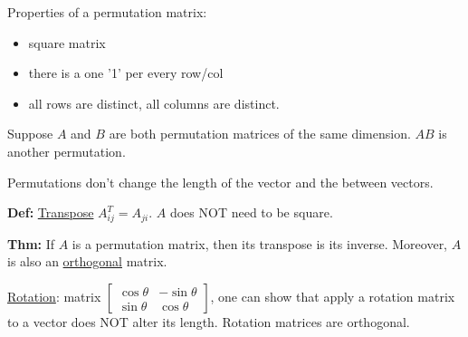 \documentclass{report}
\begin{document}
Properties of a permutation matrix:
\begin{itemize}
    \item square matrix
    \item there is a one '1' per every row/col
    \item all rows are distinct, all columns are distinct.
\end{itemize}

Suppose $A$ and $B$ are both permutation matrices of the same dimension.
$AB$ is another permutation.

Permutations don't change the length of the vector and
the between vectors.

\textbf{Def:} \underline{Transpose} $A^{T}_{ij} = A_{ji}$. $A$ does NOT
need to be square.

\textbf{Thm:} If $A$ is a permutation matrix, then its
transpose is its inverse. Moreover, $A$ is also an \underline{orthogonal}
matrix.

\vspace{2mm}

\underline{Rotation}: matrix
$\begin{bmatrix}
        \cos \theta & -\sin \theta \\
        \sin \theta & \cos \theta
    \end{bmatrix}$,
one can show that apply a rotation matrix to a vector does NOT
alter its length. Rotation matrices are orthogonal.
\end{document}
